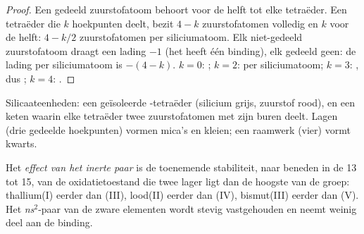 \begin{proof}
Een gedeeld zuurstofatoom behoort voor de helft tot elke tetraëder. Een
tetraëder die $k$ hoekpunten deelt, bezit $4 - k$ zuurstofatomen volledig
en $k$ voor de helft: $4 -
k/2$ zuurstofatomen per siliciumatoom. Elk niet-gedeeld zuurstofatoom
draagt een lading $-1$ (het heeft één binding), elk gedeeld geen: de
lading per siliciumatoom is $-(4 - k)$. $k = 0$: ; $k = 2$:
 per siliciumatoom; $k = 3$: , dus
; $k = 4$: .
\end{proof}

\begin{omfigure}

{\small Silicaateenheden: een geïsoleerde -tetraëder (silicium
grijs, zuurstof rood), en een keten waarin elke tetraëder twee
zuurstofatomen met zijn buren deelt. Lagen (drie gedeelde hoekpunten)
vormen mica's en kleien; een raamwerk (vier) vormt kwarts.}
\end{omfigure}

\begin{definition}\label{def:b1:p-block-13-15:inert-pair}
Het \emph{effect van het inerte paar}
is de toenemende stabiliteit, naar beneden in de  13 tot 15, van
de oxidatietoestand die twee lager ligt dan de hoogste van de groep:
thallium(I) eerder dan (III), lood(II) eerder dan (IV), bismut(III)
eerder dan (V). Het \textit{ns}$^2$-paar van de zware elementen wordt
stevig vastgehouden en neemt weinig deel aan de binding.
\end{definition}

